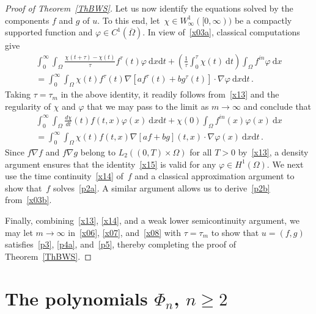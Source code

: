 \documentclass[AHL,Unicode,longabstracts,published]{cedram}
\newcommand{\rmd}{\mathrm{d}}
\begin{document}
\begin{proof}[Proof of Theorem~\ref{ThBWS}]
Let us now identify the equations solved by the components $f$ and $g$ of $u$. To this end, let~${\chi\in W^1_\infty([0,\infty))}$ be a compactly supported function and $\varphi\in C^1(\overline{\Omega})$. In view of~\eqref{x03a}, classical computations give
\begin{multline*}
\int_0^\infty \int_\Omega \frac{\chi(t+\tau)-\chi(t)}{\tau} f^\tau(t) \varphi\ \rmd x\rmd t + \left(\frac{1}{\tau} \int_0^\tau \chi(t)\ \rmd t \right) \int_\Omega f^{in}\varphi\ \rmd x \\
= \int_0^\infty \int_\Omega \chi(t) f^\tau(t) \nabla\left[af^\tau(t) + b g^\tau(t)\right] \cdot\nabla\varphi\ \rmd x\rmd t\,.
\end{multline*}
Taking $\tau=\tau_m$ in the above identity, it readily follows from~\eqref{x13} and the regularity of $\chi$ and $\varphi$ that we may pass to the limit as $m\to\infty$ and conclude that
\begin{multline}\label{x15}
\int_0^\infty \int_\Omega \frac{d\chi}{dt}(t) f(t,x) \varphi(x)\ \rmd x\rmd t + \chi(0) \int_\Omega f^{in}(x)\varphi(x)\ \rmd x \\
= \int_0^\infty \int_\Omega \chi(t) f(t,x) \nabla\left[af+ b g\right](t,x) \cdot\nabla \varphi(x)\ \rmd x\rmd t\,.
\end{multline}
Since $f\nabla f$ and $f\nabla g$ belong to $L_2((0,T)\times\Omega)$ for all $T>0$ by~\eqref{x13}, a density argument ensures that the identity~\eqref{x15} is valid for any $\varphi\in H^1(\Omega)$. We next use the time continuity~\eqref{x14} of~$f$ and a classical approximation argument to show that~$f$ solves~\eqref{p2a}. A similar argument allows us to derive~\eqref{p2b} from~\eqref{x03b}.

Finally, combining~\eqref{x13}, \eqref{x14}, and a weak lower semicontinuity argument, we may let $m\to\infty$ in~\eqref{x06}, \eqref{x07}, and~\eqref{x08} with $\tau=\tau_m$ to show that $u=(f,g)$ satisfies~\eqref{p3}, \eqref{p4a}, and~\eqref{p5}, thereby completing the proof of Theorem~\ref{ThBWS}.
\end{proof}



\appendix
\section{The polynomials \texorpdfstring{$\Phi_n$}{Phin}, \texorpdfstring{$n\ge 2$}{n>= 2}}\label{secA}
\end{document}
